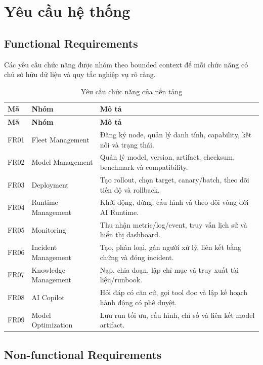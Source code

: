 \section{Yêu cầu hệ thống}

\subsection{Functional Requirements}

Các yêu cầu chức năng được nhóm theo bounded context để mỗi chức năng có chủ
sở hữu dữ liệu và quy tắc nghiệp vụ rõ ràng.

\begin{longtable}{L{1.5cm}L{4cm}L{9cm}}
\caption{Yêu cầu chức năng của nền tảng}\label{tab:functional-requirements}\\
\toprule
\textbf{Mã} & \textbf{Nhóm} & \textbf{Mô tả}\\
\midrule\endfirsthead
\toprule
\textbf{Mã} & \textbf{Nhóm} & \textbf{Mô tả}\\
\midrule\endhead
FR01 & Fleet Management & Đăng ký node, quản lý danh tính, capability, kết nối và trạng thái.\\
FR02 & Model Management & Quản lý model, version, artifact, checksum, benchmark và compatibility.\\
FR03 & Deployment & Tạo rollout, chọn target, canary/batch, theo dõi tiến độ và rollback.\\
FR04 & Runtime Management & Khởi động, dừng, cấu hình và theo dõi vòng đời AI Runtime.\\
FR05 & Monitoring & Thu nhận metric/log/event, truy vấn lịch sử và hiển thị dashboard.\\
FR06 & Incident Management & Tạo, phân loại, gán người xử lý, liên kết bằng chứng và đóng incident.\\
FR07 & Knowledge Management & Nạp, chia đoạn, lập chỉ mục và truy xuất tài liệu/runbook.\\
FR08 & AI Copilot & Hỏi đáp có căn cứ, gọi tool đọc và lập kế hoạch hành động có phê duyệt.\\
FR09 & Model Optimization & Lưu run tối ưu, cấu hình, chỉ số và liên kết model artifact.\\
\bottomrule
\end{longtable}

\subsection{Non-functional Requirements}

